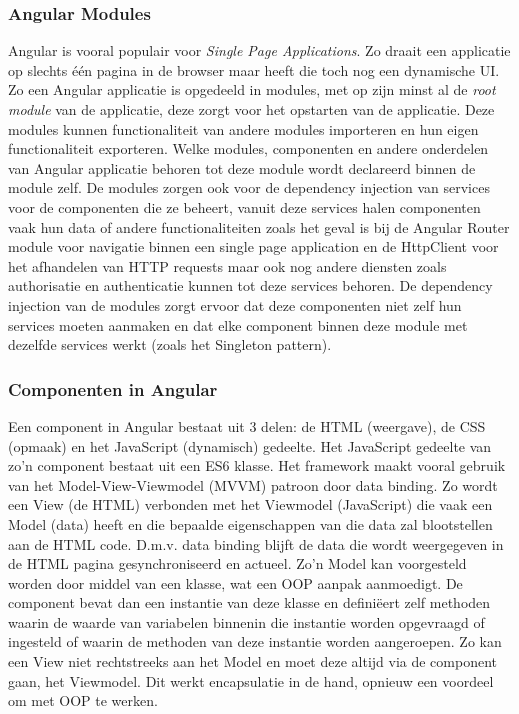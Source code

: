 \subsubsection{Angular Modules}
Angular is vooral populair voor \textit{Single Page Applications}. Zo draait een applicatie op slechts één pagina in de browser maar heeft die toch nog een dynamische UI. Zo een Angular applicatie is opgedeeld in modules, met op zijn minst al de \textit{root module} van de applicatie, deze zorgt voor het opstarten van de applicatie. Deze modules kunnen functionaliteit van andere modules importeren en hun eigen functionaliteit exporteren. Welke modules, componenten en andere onderdelen van Angular applicatie behoren tot deze module wordt declareerd binnen de module zelf. De modules zorgen ook voor de dependency injection van services voor de componenten die ze beheert, vanuit deze services halen componenten vaak hun data of andere functionaliteiten zoals het geval is bij de Angular Router module voor navigatie binnen een single page application en de HttpClient voor het afhandelen van HTTP requests maar ook nog andere diensten zoals authorisatie en authenticatie kunnen tot deze services behoren. De dependency injection van de modules zorgt ervoor dat deze componenten niet zelf hun services moeten aanmaken en dat elke component binnen deze module met dezelfde services werkt (zoals het Singleton pattern). 

\subsubsection{Componenten in Angular}
Een component in Angular bestaat uit 3 delen: de HTML (weergave), de CSS (opmaak) en het JavaScript (dynamisch) gedeelte. Het JavaScript gedeelte van zo'n component bestaat uit een ES6 klasse. Het framework maakt vooral gebruik van het Model-View-Viewmodel (MVVM) patroon door data binding. Zo wordt een View (de HTML) verbonden met het Viewmodel (JavaScript) die vaak een Model (data) heeft en die bepaalde eigenschappen van die data zal blootstellen aan de HTML code. D.m.v. data binding blijft de data die wordt weergegeven in de HTML pagina gesynchroniseerd en actueel. Zo'n Model kan voorgesteld worden door middel van een klasse, wat een OOP aanpak aanmoedigt. De component bevat dan een instantie van deze klasse en definiëert zelf methoden waarin de waarde van variabelen binnenin die instantie worden opgevraagd of ingesteld of waarin de methoden van deze instantie worden aangeroepen. Zo kan een View niet rechtstreeks aan het Model en moet deze altijd via de component gaan, het Viewmodel. Dit werkt encapsulatie in de hand, opnieuw een voordeel om met OOP te werken.

